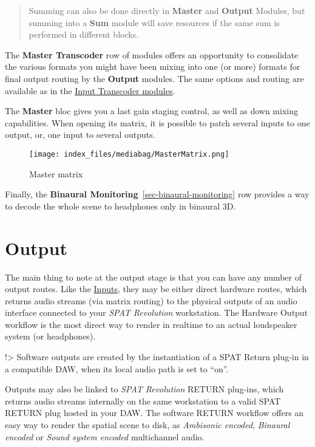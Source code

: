 \documentclass[
  letterpaper,
  DIV=11,
  numbers=noendperiod]{scrreport}
\begin{document}
\begin{quote}
Summing can also be done directly in \textbf{Master} and \textbf{Output}
Modules, but summing into a \textbf{Sum} module will save resources if
the same sum is performed in different blocks.
\end{quote}

The \textbf{Master Transcoder} row of modules offers an opportunity to
consolidate the various formats you might have been mixing into one (or
more) formats for final output routing by the \textbf{Output} modules.
The same options and routing are available as in the
\href{Spat_Environment_Input_Transcoder_Modules.md}{Input Transcoder
modules}.

The \textbf{Master} bloc gives you a last gain staging control, as well
as down mixing capabilities. When opening its matrix, it is possible to
patch several inputs to one output, or, one input to several outputs.

\begin{figure}

{\centering \texttt{[image: index\_files/mediabag/MasterMatrix.png]}

}

\caption{Master matrix}

\end{figure}

Finally, the \textbf{Binaural Monitoring}~\ref{sec-binaural-monitoring}
row provides a way to decode the whole scene to headphones only in
binaural 3D.

\hypertarget{output}{%
\chapter{Output}\label{output}}

The main thing to note at the output stage is that you can have any
number of output routes. Like the
\href{6_Spat_Environment_6_4_Inputs_6_4_Inputs.md}{Inputs}, they may be
either direct hardware routes, which returns audio streams (via matrix
routing) to the physical outputs of an audio interface connected to your
\emph{SPAT Revolution} workstation. The Hardware Output workflow is the
most direct way to render in realtime to an actual loudspeaker system
(or headphones).

!\textgreater{} Software outputs are created by the instantiation of a
SPAT Return plug-in in a compatible DAW, when its local audio path is
set to ``on''.

Outputs may also be linked to \emph{SPAT Revolution} RETURN plug-ins,
which returns audio streams internally on the same workstation to a
valid SPAT RETURN plug hosted in your DAW. The software RETURN workflow
offers an easy way to render the spatial scene to disk, as
\emph{Ambisonic encoded}, \emph{Binaural encoded} or \emph{Sound system
encoded} multichannel audio.
\end{document}
